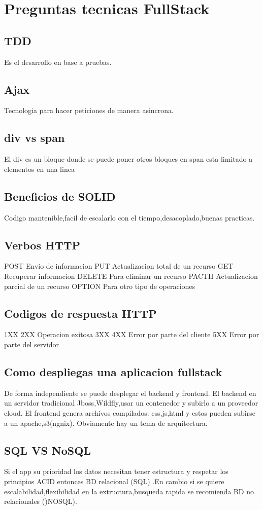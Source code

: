 \chapter{Preguntas tecnicas FullStack}
\section{TDD}
Es el desarrollo en base a pruebas.
\section{Ajax}
Tecnologia para hacer peticiones de manera asincrona.
\section{div vs span}
El div es un bloque donde se puede poner otros bloques
en span esta limitado a elementos en una linea
\section{Beneficios de SOLID}
Codigo mantenible,facil de escalarlo con el tiempo,desacoplado,buenas practicas.
\section{Verbos HTTP}
POST Envio de informacion
PUT Actualizacion total de un recurso
GET Recuperar informacion
DELETE Para eliminar un recurso
PACTH Actualizacion parcial de un recurso
OPTION Para otro tipo de operaciones
\section{Codigos de respuesta HTTP}
1XX
2XX Operacion exitosa
3XX
4XX Error por parte del cliente
5XX Error por parte del servidor
\section{Como despliegas una aplicacion fullstack}
De forma independiente se puede desplegar el backend y frontend.
El backend en un servidor tradicional Jboss,Wildfly,usar un contenedor  y subirlo a un proveedor cloud.
El frontend  genera archivos compilados: css,js,html y estos pueden subirse a un apache,s3(ngnix).
Obviamente hay un tema de arquitectura.
\section{SQL VS NoSQL}
Si el app su prioridad los datos necesitan tener estructura y respetar los principios ACID
entonces BD relacional (SQL) .En cambio si se quiere escalabilidad,flexibilidad en la extructura,busqueda rapida se recomienda BD no relacionales ()NOSQL).
